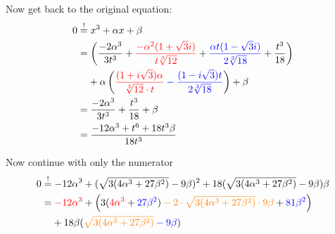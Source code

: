 Now get back to the original equation:
\begin{align}
    0 &\stackrel{!}{=} x^3 + \alpha x + \beta \\
       &= \left (\frac{-2 \alpha^3}{3 t^3}
        + \color{red}\frac{-\alpha^2(1+\sqrt{3}i)}{t\sqrt[3]{12}}\color{black}
        + \color{blue}\frac{\alpha t(1-\sqrt{3}i)}{2\sqrt[3]{18}}\color{black}
        + \frac{t^3}{18} \right )\\
    &\hphantom{{}=} + \alpha \left (\color{red}\frac{(1+i \sqrt{3})\alpha}{\sqrt[3]{12} \cdot t} \color{black}
     \color{blue}-\frac{(1-i\sqrt{3}) t}{2\sqrt[3]{18}} \color{black} \right ) + \beta\\
    &= \frac{-2 \alpha^3}{3 t^3}
    + \frac{t^3}{18}
    + \beta\\
    &= \frac{-12 \alpha^3 + t^6+18 t^3 \beta}{18t^3}
\end{align}

Now continue with only the numerator
\begin{align}
    0 &\stackrel{!}{=}
    - 12 \alpha^3 
    + (\sqrt{3(4 \alpha^3 + 27 \beta^2)}-9\beta)^2
    + 18 (\sqrt{3(4 \alpha^3 + 27 \beta^2)} - 9 \beta) \beta\\
    &= 
    \color{red}- 12 \alpha^3 \color{black}+
    \left (
        3(\color{red}4 \alpha^3\color{black} + \color{blue}27 \beta^2 \color{black})
        \color{orange}- 2 \cdot \sqrt{3(4 \alpha^3 + 27 \beta^2)} \cdot 9\beta\color{black}
        + \color{blue}81 \beta^2\color{black}
    \right )\\
    &\hphantom{{}=}+ 18 \beta (\color{orange}\sqrt{3(4 \alpha^3 + 27 \beta^2)}\color{black} \color{blue}- 9 \beta\color{black}) 
\end{align}
